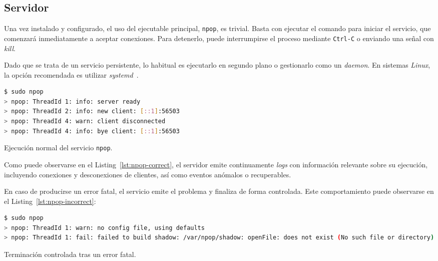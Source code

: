 \documentclass[a4paper]{CSMakotoTechnicalReport}
\begin{document}

\subsection{Servidor}

Una vez instalado y configurado, el uso del ejecutable principal, \texttt{npop}, es trivial. Basta con ejecutar el comando para iniciar el servicio, que comenzará inmediatamente a aceptar conexiones. Para detenerlo, puede interrumpirse el proceso mediante \texttt{Ctrl-C} o enviando una señal con \textit{kill}.

Dado que se trata de un servicio persistente, lo habitual es ejecutarlo en segundo plano o gestionarlo como un \textit{daemon}. En sistemas \textit{Linux}, la opción recomendada es utilizar \textit{systemd}~\cite{rajpurohit2023systemd}.

\vspace{-6pt}
\begin{minipage}{\linewidth}
\begin{lstlisting}[language=bash, numbers=none, basicstyle=\footnotesize]
$ sudo npop
> npop: ThreadId 1: info: server ready
> npop: ThreadId 2: info: new client: [::1]:56503
> npop: ThreadId 4: warn: client disconnected
> npop: ThreadId 4: info: bye client: [::1]:56503
\end{lstlisting}
\captionsetup{type=lstlisting}
\caption{Ejecución normal del servicio \texttt{npop}.}
\label{lst:npop-correct}
\end{minipage}
\vspace{2pt}

Como puede observarse en el Listing~\ref{lst:npop-correct}, el servidor emite continuamente \textit{logs} con información relevante sobre su ejecución, incluyendo conexiones y desconexiones de clientes, así como eventos anómalos o recuperables.

En caso de producirse un error fatal, el servicio emite el problema y finaliza de forma controlada. Este comportamiento puede observarse en el Listing~\ref{lst:npop-incorrect}:

\vspace{-6pt}
\begin{minipage}{\linewidth}
\begin{lstlisting}[language=bash, numbers=none, basicstyle=\footnotesize]
$ sudo npop
> npop: ThreadId 1: warn: no config file, using defaults
> npop: ThreadId 1: fail: failed to build shadow: /var/npop/shadow: openFile: does not exist (No such file or directory)
\end{lstlisting}
\captionsetup{type=lstlisting}
\caption{Terminación controlada tras un error fatal.}
\label{lst:npop-incorrect}
\end{minipage}
\vspace{2pt}
\end{document}
